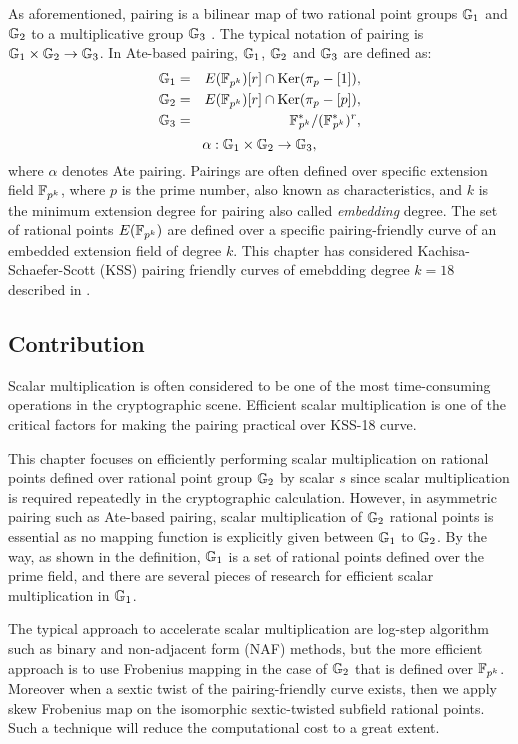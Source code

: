 As aforementioned, pairing is a bilinear map of two rational point groups ${\mathbb{G}}_{1}$ and ${\mathbb{G}}_{2}$ to a multiplicative group ${\mathbb{G}}_{3}$ \cite{Silverman}.
The typical notation of pairing is ${\mathbb{G}}_{1} \times {\mathbb{G}}_{2} \rightarrow {\mathbb{G}}_{3}$.
In  Ate-based pairing, ${\mathbb{G}}_{1}$, ${\mathbb{G}}_{2}$ and ${\mathbb{G}}_{3}$ are defined as:
\begin{eqnarray}\label{eqn_g1g2g3_group_kss18}
{\mathbb{G}}_{1} & = &  E({\mathbb{F}}_{p^{k}}) [r] \cap \text{Ker}(\pi_p - [1]), \nonumber \\
{\mathbb{G}}_{2} & = &  E({\mathbb{F}}_{p^{k}}) [r] \cap \text{Ker}(\pi_p - [p]), \nonumber \\
{\mathbb{G}}_{3} & = & {{\mathbb{F}}^{\ast}}_{\!\!\!p^{k}}/({{\mathbb{F}}^{\ast}}_{\!\!\!p^{k}})^r, \nonumber
\end{eqnarray}
\begin{equation}
\alpha : {\mathbb{G}}_{1} \times {\mathbb{G}}_{2} \rightarrow {\mathbb{G}}_{3},  \nonumber
\end{equation}
where $\alpha$ denotes Ate pairing.
Pairings are often defined over specific extension field $\mathbb{F}_{p^k}$, where $p$ is the prime number, also known as characteristics, and $k$  is the minimum extension degree for pairing also called \textit{embedding} degree. 
The set of rational points $E(\mathbb{F}_{p^k})$ are defined over a specific pairing-friendly curve of an embedded extension field of degree $k$.
This chapter has considered Kachisa-Schaefer-Scott (KSS) \cite{EPRINT:KacSchSco07} pairing friendly curves of emebdding degree $k=18$ described in \cite{EPRINT:FreScoTes06}.


\subsection{Contribution}
Scalar multiplication is often considered to be one of the most time-consuming operations in the cryptographic scene. 
Efficient scalar multiplication is one of the critical factors for making the pairing practical over KSS-18 curve.

This chapter focuses on efficiently performing scalar multiplication on rational points defined over rational point group ${\mathbb{G}}_{2}$ by scalar $s$ since scalar multiplication is required repeatedly in the cryptographic calculation.
However, in asymmetric pairing such as Ate-based pairing, scalar multiplication of ${\mathbb{G}}_{2}$ rational points is essential as no mapping function is explicitly given between ${\mathbb{G}}_{1}$ to ${\mathbb{G}}_{2}$.
By the way, as shown in the definition, ${\mathbb{G}}_{1}$ is a set of rational points defined over the prime field, and there are several pieces of research \cite{CANS:SNOKM08} for efficient scalar multiplication in ${\mathbb{G}}_{1}$.

The typical approach to accelerate scalar multiplication are log-step algorithm such as binary and non-adjacent form (NAF) methods, but the more efficient approach is to use Frobenius mapping in the case of ${\mathbb{G}}_{2}$ that is defined over ${\mathbb{F}}_{p^{k}}$.
Moreover when a sextic twist of the pairing-friendly curve exists, then we apply skew Frobenius map on the isomorphic sextic-twisted subfield rational points. Such a technique will reduce the computational cost to a great extent.

